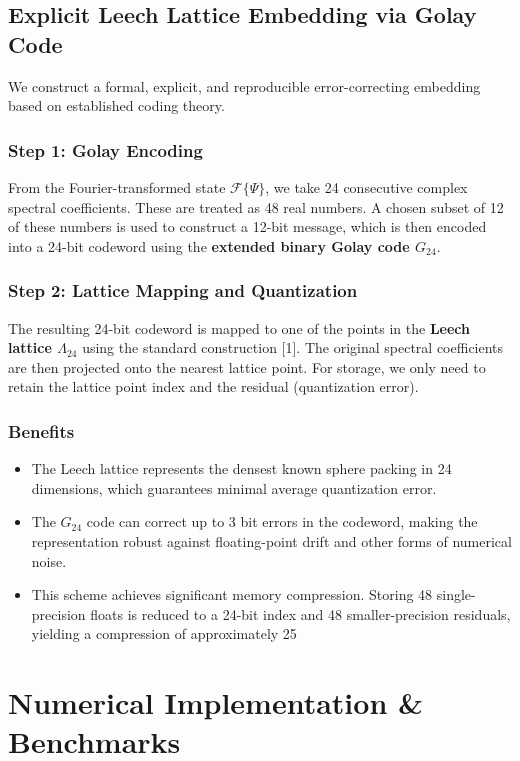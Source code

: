 \documentclass[12pt]{article}
\begin{document}
\subsection{Explicit Leech Lattice Embedding via Golay Code}
We construct a formal, explicit, and reproducible error-correcting embedding based on established coding theory.

\subsubsection*{Step 1: Golay Encoding}
From the Fourier-transformed state $ \mathcal{F}\{\Psi\} $, we take 24 consecutive complex spectral coefficients. These are treated as 48 real numbers. A chosen subset of 12 of these numbers is used to construct a 12-bit message, which is then encoded into a 24-bit codeword using the \textbf{extended binary Golay code $ G_{24} $}.

\subsubsection*{Step 2: Lattice Mapping and Quantization}
The resulting 24-bit codeword is mapped to one of the points in the \textbf{Leech lattice $ \Lambda_{24} $} using the standard construction [1]. The original spectral coefficients are then projected onto the nearest lattice point. For storage, we only need to retain the lattice point index and the residual (quantization error).

\subsubsection*{Benefits}
\begin{itemize}
    \item The Leech lattice represents the densest known sphere packing in 24 dimensions, which guarantees minimal average quantization error.
    \item The $ G_{24} $ code can correct up to 3 bit errors in the codeword, making the representation robust against floating-point drift and other forms of numerical noise.
    \item This scheme achieves significant memory compression. Storing 48 single-precision floats is reduced to a 24-bit index and 48 smaller-precision residuals, yielding a compression of approximately 25%
\end{itemize}

\section{Numerical Implementation & Benchmarks}
\end{document}
